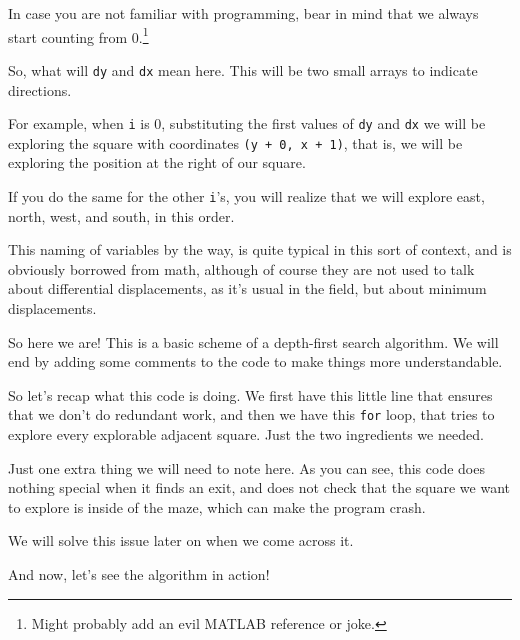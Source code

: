 \documentclass[12pt]{article}
\renewcommand{\v}[1]{\texttt{#1}}
\begin{document}
In case you are not familiar with programming, bear in mind
that we always start counting from 0.\footnote{Might probably add
an evil MATLAB reference or joke.}

So, what will \v{dy} and \v{dx} mean here.
This will be two small arrays to indicate directions.

For example, when \v{i} is 0, substituting
the first values of \v{dy} and \v{dx} we will be exploring
the square with coordinates \v{(y + 0, x + 1)},
that is, we will be exploring the position at the right
of our square.

If you do the same for the other \v{i}'s, you will realize
that we will explore east, north, west, and south, in this order.

This naming of variables by the way, is quite typical
in this sort of context, and is obviously borrowed from math,
although of course they are not used to talk about differential
displacements, as it's usual in the field,
but about minimum displacements.

So here we are! This is a basic scheme of a depth-first
search algorithm. We will end by adding some comments
to the code to make things more understandable.

So let's recap what this code is doing. We first have this
little line that ensures that we don't do redundant work,
and then we have this \v{for} loop, that tries to explore
every explorable adjacent square. Just the two ingredients
we needed.

Just one extra thing we will need to note here.
As you can see, this code does nothing special
when it finds an exit, and does not check that
the square we want to explore is inside of the maze,
which can make the program crash.

We will solve this issue later on when we come across it.

And now, let's see the algorithm in action!


%
%
%
\end{document}

